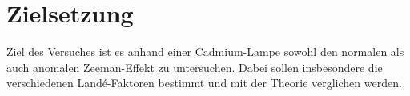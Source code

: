 
\section{Zielsetzung}
\label{sec:Zielsetzung}
Ziel des Versuches ist es anhand einer Cadmium-Lampe sowohl den normalen als auch anomalen Zeeman-Effekt zu untersuchen. Dabei sollen insbesondere die verschiedenen Landé-Faktoren bestimmt und mit der Theorie verglichen werden. 
